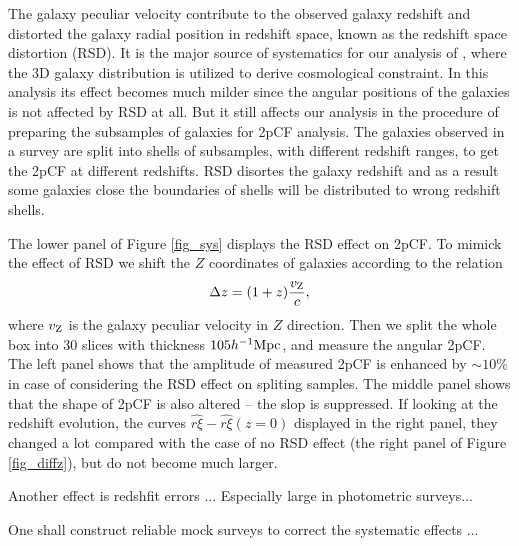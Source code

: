 \documentclass[iop]{emulateapj}
\begin{document}
The galaxy peculiar velocity contribute to the observed galaxy redshift and distorted the galaxy radial position in redshift space,
known as the redshift space distortion (RSD).
It is the major source of systematics for our analysis of \cite{Li2014,Li2015,Li2016}, where the 3D galaxy distribution is utilized to derive cosmological constraint.
In this analysis its effect becomes much milder since the angular positions of the galaxies is not affected by RSD at all.
But it still affects our analysis in the procedure of preparing the subsamples of galaxies for 2pCF analysis.
The galaxies observed in a survey are split into shells of subsamples, with different redshift ranges, to get the 2pCF at different redshifts.
RSD disortes the galaxy redshift and as a result some galaxies close the boundaries of shells will be distributed to wrong redshift shells.

The lower panel of Figure \ref{fig_sys} displays the RSD effect on 2pCF.
To mimick the effect of RSD we shift the $Z$ coordinates of galaxies according to the relation 
\begin{equation}\label{eq:zvpeu}
\Delta z = (1+z) \frac{v_{{\rm Z}}}{c},
\end{equation}
where $v_{{\rm Z}}$ is the galaxy peculiar velocity in $Z$ direction.
Then we split the whole box into 30 slices with thickness $105h^{-1}\rm Mpc$, 
and measure the angular 2pCF.
The left panel shows that the amplitude of measured 2pCF is enhanced by $\sim 10\%$ in case of considering the RSD effect on spliting samples.
The middle panel shows that the shape of 2pCF is also altered -- the slop is suppressed.
If looking at the redshift evolution,
the curves $\hat{r\xi} - \hat{r\xi}(z=0)$ displayed in the right panel,
they changed a lot compared with the case of no RSD effect (the right panel of Figure \ref{fig_diffz}),
but do not become much larger. %


Another effect is redshfit errors ...
Especially large in photometric surveys...

One shall construct reliable mock surveys to correct the systematic effects ...

\end{document}
